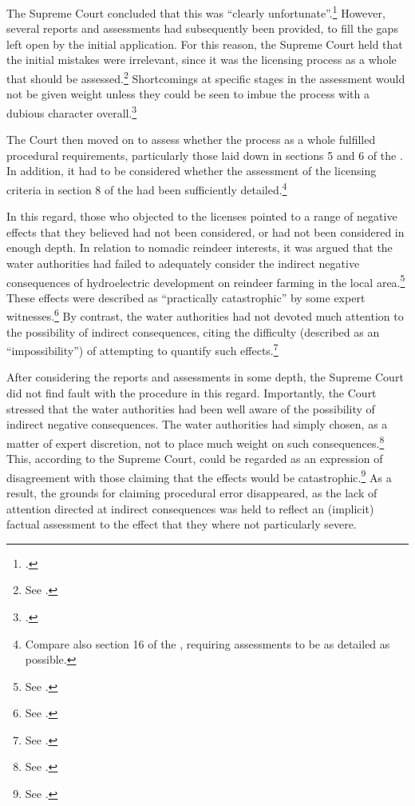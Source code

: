 The Supreme Court concluded that this was ``clearly unfortunate''.\footcite[265]{alta82} However, several reports and assessments had subsequently been provided, to fill the gaps left open by the initial application. For this reason, the Supreme Court held that the initial mistakes were irrelevant, since it was the licensing process as a whole that should be assessed.\footnote{See \cite[265-266]{alta82}.} Shortcomings at specific stages in the assessment would not be given weight unless they could be seen to imbue the process with a dubious character overall.\footcite[265]{alta82}

The Court then moved on to assess whether the process as a whole fulfilled procedural requirements, particularly those laid down in sections 5 and 6 of the \cite{wra17}. In addition, it had to be considered whether the assessment of the licensing criteria in section 8 of the \cite{wra17} had been sufficiently detailed.\footnote{Compare also section 16 of the \cite{paa67}, requiring assessments to be as detailed as possible.}

In this regard, those who objected to the licenses pointed to a range of negative effects that they believed had not been considered, or had not been considered in enough depth. In relation to nomadic reindeer interests, it was argued that the water authorities had failed to adequately consider the indirect negative consequences of hydroelectric development on reindeer farming in the local area.\footnote{See \cite[176-179]{alta82}.} These effects were described as ``practically catastrophic'' by some expert witnesses.\footnote{See \cite[278]{alta82}.} By contrast, the water authorities had not devoted much attention to the possibility of indirect consequences, citing the difficulty (described as an ``impossibility'') of attempting to quantify such effects.\footnote{See \cite[277]{alta82}.}

After considering the reports and assessments in some depth, the Supreme Court did not find fault with the procedure in this regard. Importantly, the Court stressed that the water authorities had been well aware of the possibility of indirect negative consequences. The water authorities had simply chosen, as a matter of expert discretion, not to place much weight on such consequences.\footnote{See \cite[279]{alta82}.} This, according to the Supreme Court, could be regarded as an expression of disagreement with those claiming that the effects would be catastrophic.\footnote{See \cite[278]{alta82}.} As a result, the grounds for claiming procedural error disappeared, as the lack of attention directed at indirect consequences was held to reflect an (implicit) factual assessment to the effect that they where not particularly severe.

